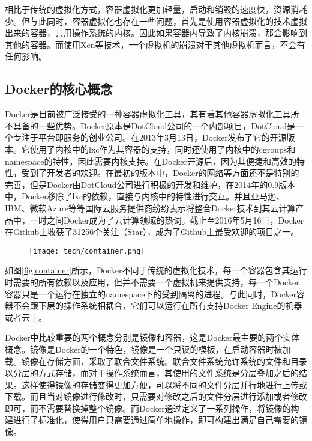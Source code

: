 相比于传统的虚拟化方式，容器虚拟化更加轻量，启动和销毁的速度快，资源消耗少。但与此同时，容器虚拟化也存在一些问题，首先是使用容器虚拟化的技术虚拟出来的容器，共用操作系统的内核。因此如果容器内导致了内核崩溃，那会影响到其他的容器。而使用Xen等技术，一个虚拟机的崩溃对于其他虚拟机而言，不会有任何影响。\cite{dua2014virtualization}

\subsection{Docker的核心概念}

Docker是目前被广泛接受的一种容器虚拟化工具，其有着其他容器虚拟化工具所不具备的一些优势。Docker原本是DotCloud公司的一个内部项目，DotCloud是一个专注于平台即服务的创业公司。在2013年3月13日，Docker发布了它的开源版本。它使用了内核中的lxc作为其容器的支持，同时还使用了内核中的cgroups和namespace的特性，因此需要内核支持。在Docker开源后，因为其便捷和高效的特性，受到了开发者的欢迎。在最初的版本中，Docker的网络等方面还不是特别的完善，但是Docker由DotCloud公司进行积极的开发和维护，在2014年的0.9版本中，Docker移除了lxc的依赖，直接与内核中的特性进行交互。并且亚马逊、IBM、微软Azure等等国际云服务提供商纷纷表示将整合Docker技术到其云计算产品中，一时之间Docker成为了云计算领域的热词。截止至2016年5月16日，Docker在Github上收获了31256个关注（Star），成为了Github上最受欢迎的项目之一。

\begin{figure}[!htp]
  \centering
  \texttt{[image: tech/container.png]}
\end{figure}

如图\ref{fig:container}所示，Docker不同于传统的虚拟化技术，每一个容器包含其运行时需要的所有依赖以及应用，但并不需要一个虚拟机来提供支持，每一个Docker容器只是一个运行在独立的namespace下的受到隔离的进程。与此同时，Docker容器不会跟下层的操作系统相耦合，它们可以运行在所有支持Docker Engine的机器或者云上。

Docker中比较重要的两个概念分别是镜像和容器，这是Docker最主要的两个实体概念。镜像是Docker的一个特色，镜像是一个只读的模板，在启动容器时被加载。镜像在存储方面，采取了联合文件系统。联合文件系统允许系统的文件和目录以分层的方式存储，而对于操作系统而言，其使用的文件系统是分层叠加之后的结果。这样使得镜像的存储变得更加方便，可以将不同的文件分层并行地进行上传或下载。而且当对镜像进行修改时，只需要对修改之后的文件分层进行添加或者修改即可，而不需要替换掉整个镜像。而Docker通过定义了一系列操作，将镜像的构建进行了标准化，使得用户只需要通过简单地操作，即可构建出满足自己需要的镜像。

